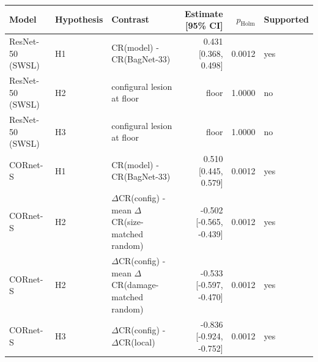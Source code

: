 \begin{tabular}{lllrrl}
\hline
Model & Hypothesis & Contrast & Estimate [95\% CI] & $p_\mathrm{Holm}$ & Supported \\
\hline
ResNet-50 (SWSL) & H1 & CR(model) - CR(BagNet-33) & 0.431 [0.368, 0.498] & 0.0012 & yes \\
ResNet-50 (SWSL) & H2 & configural lesion at floor & floor & 1.0000 & no \\
ResNet-50 (SWSL) & H3 & configural lesion at floor & floor & 1.0000 & no \\
CORnet-S & H1 & CR(model) - CR(BagNet-33) & 0.510 [0.445, 0.579] & 0.0012 & yes \\
CORnet-S & H2 & $\Delta$CR(config) - mean $\Delta$CR(size-matched random) & -0.502 [-0.565, -0.439] & 0.0012 & yes \\
CORnet-S & H2 & $\Delta$CR(config) - mean $\Delta$CR(damage-matched random) & -0.533 [-0.597, -0.470] & 0.0012 & yes \\
CORnet-S & H3 & $\Delta$CR(config) - $\Delta$CR(local) & -0.836 [-0.924, -0.752] & 0.0012 & yes \\
\hline
\end{tabular}